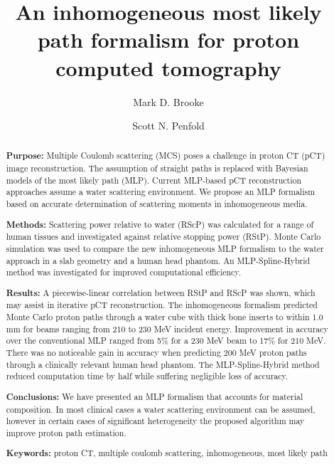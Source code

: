 \documentclass[preprint,times]{elsarticle}
\begin{document}
\doublespacing

\title{An inhomogeneous most likely path formalism for proton computed tomography}

\author[add1,add2]{Mark D. Brooke}
\author[add2,add3]{Scott N. Penfold}

\address[add1]{Department of Oncology, University of Oxford, Old Road Campus, Roosevelt Drive, Oxford, OX3 7DQ, United Kingdom}
\address[add2]{Department of Physics, University of Adelaide, Adelaide, South Australia, 5005, Australia}
\address[add3]{Department of Medical Physics, Royal Adelaide Hospital, Adelaide, South Australia, 5000, Australia}

\begin{abstract}
\textbf{Purpose:} Multiple Coulomb scattering (MCS) poses a challenge in proton CT (pCT) image reconstruction. The assumption of straight paths is replaced with Bayesian models of the most likely path (MLP). Current MLP-based pCT reconstruction approaches assume a water scattering environment. We propose an MLP formalism based on accurate determination of scattering moments in inhomogeneous media.

\noindent\textbf{Methods:} Scattering power relative to water (RScP) was calculated for a range of human tissues and investigated against relative stopping power (RStP). Monte Carlo simulation was used to compare the new inhomogeneous MLP formalism to the water approach in a slab geometry and a human head phantom. An MLP-Spline-Hybrid method was investigated for improved computational efficiency.

\noindent\textbf{Results:} A piecewise-linear correlation between RStP and RScP was shown, which may assist in iterative pCT reconstruction. The inhomogeneous formalism predicted Monte Carlo proton paths through a water cube with thick bone inserts to within 1.0 mm for beams ranging from 210 to 230 MeV incident energy. Improvement in accuracy over the conventional MLP ranged from 5\% for a 230 MeV beam to 17\% for 210 MeV. There was no noticeable gain in accuracy when predicting 200 MeV proton paths through a clinically relevant human head phantom. The MLP-Spline-Hybrid method reduced computation time by half while suffering negligible loss of accuracy.

\noindent\textbf{Conclusions:} We have presented an MLP formalism that accounts for material composition. In most clinical cases a water scattering environment can be assumed, however in certain cases of significant heterogeneity the proposed algorithm may improve proton path estimation.

\noindent\textbf{Keywords:} proton CT, multiple coulomb scattering, inhomogeneous, most likely path
\end{abstract}
\end{document}
